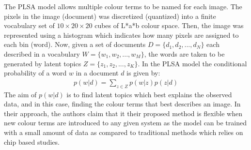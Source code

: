 The PLSA model allows multiple colour terms to be named for each image. The pixels in the image (document) was discretized (quantized) into a finite vocabulary set of $10 \times 20 \times 20$ cubes of L*a*b colour space. Then, the image was represented using a histogram which indicates how many pixels are assigned to each bin (word). Now, given a set of documents $D = \{d_1, d_2, ... , d_N\}$ each described in a vocabulary $W = \{w_1, w_2, ... , w_M\}$, the words are taken to be generated by latent topics $Z = \{z_1, z_2, ... , z_K\}$. In the PLSA model the conditional probability of a word $w$ in a document $d$ is given by:
\begin{align}
    p(w|d) = \sum_{z\in Z}{p(w|z)p(z|d)}
\end{align}
The aim of $p(w|d)$ is to find latent topics which best explains the observed data, and in this case, finding the colour terms that best describes an image. In their approach, the authors claim that it their proposed method is flexible when new colour terms are introduced to any given system as the model can be trained with a small amount of data as compared to traditional methods which relies on chip based studies. 

